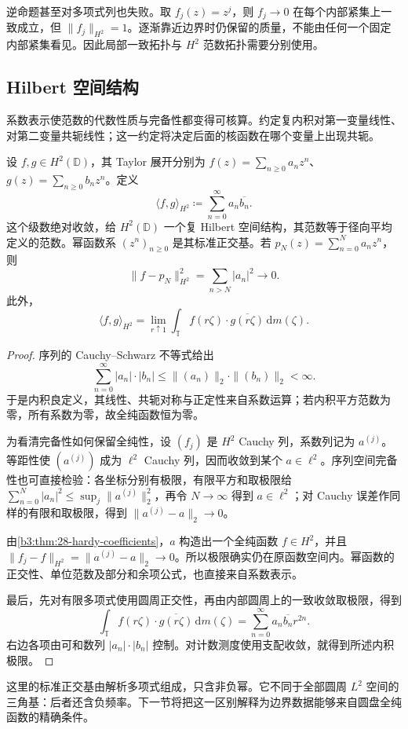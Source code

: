 \ProseParagraphBreak
逆命题甚至对多项式列也失败。取 \(f_j(z)=z^j\)，则 \(f_j\to0\) 在每个内部紧集上一致成立，但 \(\|f_j\|_{H^2}=1\)。逐渐靠近边界时仍保留的质量，不能由任何一个固定内部紧集看见。因此局部一致拓扑与 \(H^2\) 范数拓扑需要分别使用。

\subsection{Hilbert 空间结构}
\label{b3:subsec:280104}

系数表示使范数的代数性质与完备性都变得可核算。约定复内积对第一变量线性、对第二变量共轭线性；这一约定将决定后面的核函数在哪个变量上出现共轭。

\begin{proposition}[内积、完备性与多项式逼近]\label{b3:prop:28-hardy-hilbert}
设 \(f,g\in H^2(\mathbb D)\)，其 Taylor 展开分别为 \(f(z)=\sum_{n\ge0}a_nz^n\)、\(g(z)=\sum_{n\ge0}b_nz^n\)。定义
\begin{equation}\label{b3:eq:28-hardy-inner-product}
 \langle f,g\rangle_{H^2}\coloneqq
 \sum_{n=0}^{\infty}a_n\overline{b_n}.
\end{equation}
这个级数绝对收敛，给 \(H^2(\mathbb D)\) 一个复 Hilbert 空间结构，其范数等于径向平均定义的范数。幂函数系 \((z^n)_{n\ge0}\) 是其标准正交基。若 \(p_N(z)=\sum_{n=0}^Na_nz^n\)，则
\[
 \|f-p_N\|_{H^2}^2=\sum_{n>N}|a_n|^2\longrightarrow0.
\]
此外，
\[
 \langle f,g\rangle_{H^2}
 =\lim_{r\uparrow1}
   \int_{\mathbb T}f(r\zeta)\cdot\overline{g(r\zeta)}\,\mathrm dm(\zeta).
\]
\end{proposition}
\begin{proof}
序列的 Cauchy--Schwarz 不等式给出
\[
 \sum_{n=0}^{\infty}|a_n|\cdot|b_n|
 \le\|(a_n)\|_2\cdot\|(b_n)\|_2<\infty.
\]
于是内积良定义，其线性、共轭对称与正定性来自系数运算；若内积平方范数为零，所有系数为零，故全纯函数恒为零。

为看清完备性如何保留全纯性，设 \((f_j)\) 是 \(H^2\) Cauchy 列，系数列记为 \(a^{(j)}\)。等距性使 \((a^{(j)})\) 成为 \(\ell^2\) Cauchy 列，因而收敛到某个 \(a\in\ell^2\)。序列空间完备性也可直接检验：各坐标分别有极限，有限平方和取极限给 \(\sum_{n=0}^N|a_n|^2\le\sup_j\|a^{(j)}\|_2^2\)，再令 \(N\to\infty\) 得到 \(a\in\ell^2\)；对 Cauchy 误差作同样的有限和取极限，得到 \(\|a^{(j)}-a\|_2\to0\)。

由\cref{b3:thm:28-hardy-coefficients}，\(a\) 构造出一个全纯函数 \(f\in H^2\)，并且 \(\|f_j-f\|_{H^2}=\|a^{(j)}-a\|_2\to0\)。所以极限确实仍在原函数空间内。幂函数的正交性、单位范数及部分和余项公式，也直接来自系数表示。

最后，先对有限多项式使用圆周正交性，再由内部圆周上的一致收敛取极限，得到
\[
 \int_{\mathbb T}f(r\zeta)\cdot\overline{g(r\zeta)}\,\mathrm dm(\zeta)
 =\sum_{n=0}^{\infty}a_n\overline{b_n}r^{2n}.
\]
右边各项由可和数列 \(|a_n|\cdot|b_n|\) 控制。对计数测度使用支配收敛，就得到所述内积极限。
\end{proof}

这里的标准正交基由解析多项式组成，只含非负幂。它不同于全部圆周 \(L^2\) 空间的三角基：后者还含负频率。下一节将把这一区别解释为边界数据能够来自圆盘全纯函数的精确条件。
